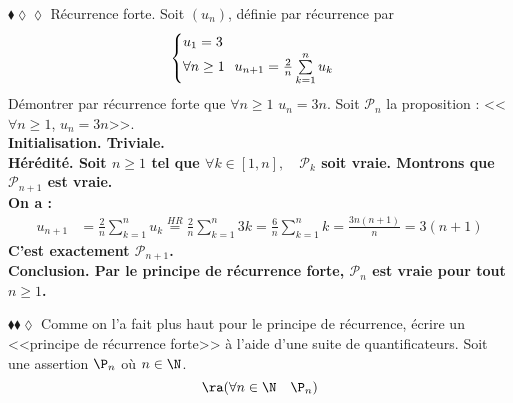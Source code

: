 \documentclass[11pt]{article}
\begin{document}
\pagebreak

\begin{exercice}{$\blacklozenge\lozenge\lozenge$ Récurrence forte.}{}
    Soit $(u_n)$, définie par récurrence par
    \begin{equation*}
        \begin{cases}
            u_1 = 3\\
            \forall{n\geq1} \hspace{0.25cm} u_{n+1}= \frac{2}{n}\sum\limits^{n}_{k=1}{u_k}
        \end{cases}
    \end{equation*}
    Démontrer par récurrence forte que $\forall{n\geq1}$ $u_n=3n$.
    \tcblower
    Soit $\mathcal{P}_n$ la proposition : <<$\forall{n\geq1}$, $u_n=3n$>>.\\
    \bf{Initialisation.} Triviale.\\
    \bf{Hérédité.} Soit $n\geq1$ tel que $\forall k\in[1,n], \quad \mathcal{P}_k$ soit vraie. Montrons que $\mathcal{P}_{n+1}$ est vraie.\\
    On a :
    \begin{align*}
        u_{n+1} 
        &= \frac{2}{n}\sum^{n}_{k=1}{u_k}
        \stackrel{HR}{=} \frac{2}{n}\sum^{n}_{k=1}{3k}
        = \frac{6}{n}\sum^{n}_{k=1}{k}
        = \frac{3n(n+1)}{n}
        = 3(n+1)
    \end{align*}
    C'est exactement $\mathcal{P}_{n+1}$.\\
    \bf{Conclusion.} Par le principe de récurrence forte, $\mathcal{P}_n$ est vraie pour tout $n\geq1$.
\end{exercice}

\begin{exercice}{$\blacklozenge\blacklozenge\lozenge$}{}
    Comme on l'a fait plus haut pour le principe de récurrence, écrire un <<principe de récurrence forte>> à l'aide d'une suite de quantificateurs.
    \tcblower
    Soit une assertion $\P_n$ où $n\in\N$.
    \begin{equation*}
        [\forall n \in \N \quad  \left( \forall k \in \lb 0, n \rb \quad \P_k \right) \Rightarrow \P_{n+1}] \ra (\forall n \in \N \quad \P_n)
    \end{equation*}
\end{exercice}
\end{document}

